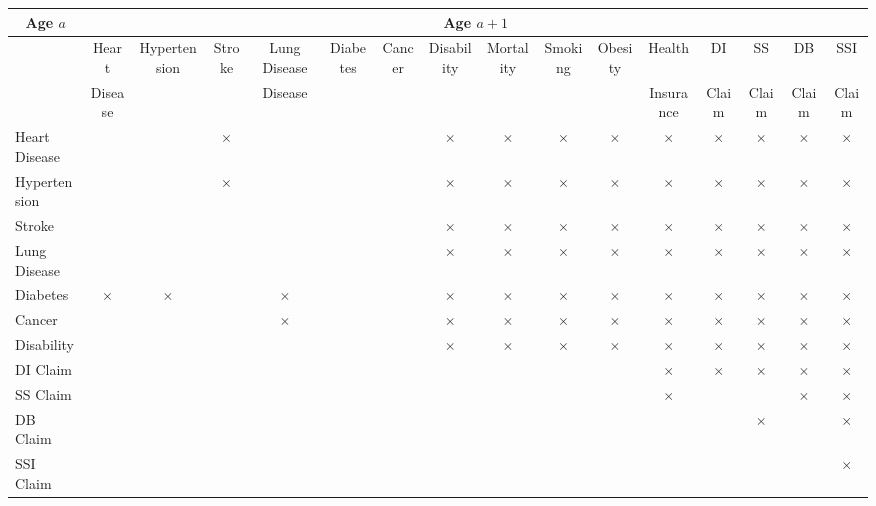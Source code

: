 \begin{tabular}{l|ccccccccccccccc} \hline \hline 
\multicolumn{1}{c}{Age $a$} & \multicolumn{15}{c}{Age $a+1$} \\ \hline
  & Heart & Hypertension & Stroke & Lung Disease & Diabetes & Cancer & Disability & Mortality & Smoking & Obesity & Health  & DI  & SS  & DB  & SSI  \\
&  Disease &  &  & Disease & & & & &  &  & Insurance & Claim & Claim & Claim & Claim \\
Heart Disease & & & $\times$& & & &$\times$ &$\times$ &$\times$ &     $\times$        &  $\times$      &  $\times$  & $\times$ & $\times$ & $\times$\\
Hypertension  & & & $\times$ & & & &$\times$ &$\times$ &$\times$ &         $\times$    &   $\times$    & $\times$   & $\times$ & $\times$ & $\times$ \\
Stroke           & & & & & & &$\times$ &$\times$ &$\times$ &       $\times$       &     $\times$   &   $\times$  & $\times$ & $\times$ & $\times$ \\
Lung Disease & & & & & & &$\times$ &$\times$ & $\times$&       $\times$      &   $\times$     &   $\times$  &$\times$  & $\times$ & $\times$ \\
Diabetes       & $\times$ &$\times$  & &  $\times$ & & &$\times$ &$\times$ & $\times$&         $\times$    &   $\times$     &  $\times$   & $\times$ & $\times$ & $\times$ \\
Cancer         & & & &  $\times$ & & &$\times$ & $\times$& $\times$&     $\times$       &   $\times$      &   $\times$  & $\times$ & $\times$ & $\times$ \\
Disability     & & & & & & &$\times$ &$\times$ & $\times$&     $\times$       &    $\times$     &     $\times$  & $\times$ & $\times$ & $\times$ \\
\hline
DI Claim      & & & & &  & & & & &            &    $\times$     & $\times$      & $\times$ & $\times$ & $\times$ \\
SS Claim     & & & & & & & & &           &         &    $\times$  & & & $\times$ & $\times$\\
DB Claim    & & & & &&  & & & &         &        &      & $\times$ & & $\times$ \\
SSI Claim   & & & & &&  & & & &         &        &      & & & $\times$ \\ \hline \hline
\end{tabular}